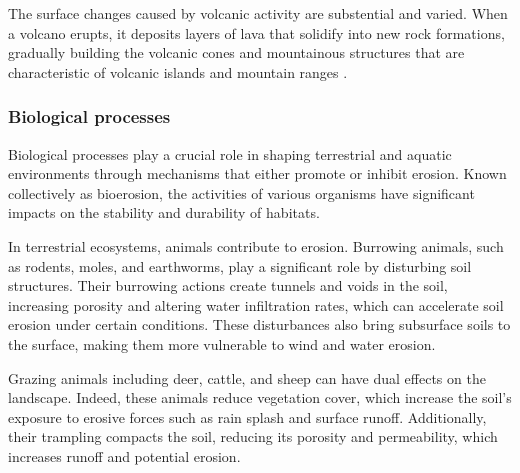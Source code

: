 The surface changes caused by volcanic activity are substential and varied. When a volcano erupts, it deposits layers of lava that solidify into new rock formations, gradually building the volcanic cones and mountainous structures that are characteristic of volcanic islands and mountain ranges \cite{Woodroffe2003}.




\subsubsection{Biological processes}
Biological processes play a crucial role in shaping terrestrial and aquatic environments through mechanisms that either promote or inhibit erosion. Known collectively as bioerosion, the activities of various organisms have significant impacts on the stability and durability of habitats.

In terrestrial ecosystems, animals contribute to erosion. Burrowing animals, such as rodents, moles, and earthworms, play a significant role by disturbing soil structures. Their burrowing actions create tunnels and voids in the soil, increasing porosity and altering water infiltration rates, which can accelerate soil erosion under certain conditions. These disturbances also bring subsurface soils to the surface, making them more vulnerable to wind and water erosion. 

Grazing animals including deer, cattle, and sheep can have dual effects on the landscape. Indeed, these animals reduce vegetation cover, which increase the soil's exposure to erosive forces such as rain splash and surface runoff. Additionally, their trampling compacts the soil, reducing its porosity and permeability, which increases runoff and potential erosion. 

